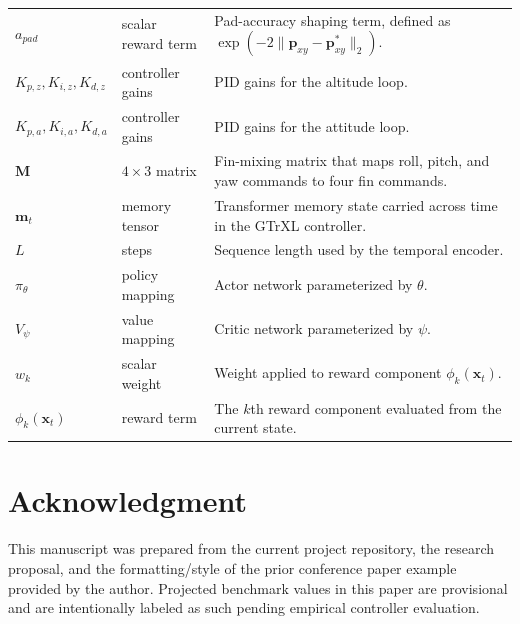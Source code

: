 \documentclass[10pt,twocolumn]{article}
\begin{document}
\begin{table}[!t]
\begin{tabularx}{\textwidth}{@{}p{1.25in}p{1.50in}X@{}}
$a_{pad}$ & scalar reward term & Pad-accuracy shaping term, defined as $\exp(-2\|\mathbf{p}_{xy}-\mathbf{p}^{*}_{xy}\|_2)$. \\
$K_{p,z},K_{i,z},K_{d,z}$ & controller gains & PID gains for the altitude loop. \\
$K_{p,a},K_{i,a},K_{d,a}$ & controller gains & PID gains for the attitude loop. \\
$\mathbf{M}$ & $4\times 3$ matrix & Fin-mixing matrix that maps roll, pitch, and yaw commands to four fin commands. \\
$\mathbf{m}_{t}$ & memory tensor & Transformer memory state carried across time in the GTrXL controller. \\
$L$ & steps & Sequence length used by the temporal encoder. \\
$\pi_{\theta}$ & policy mapping & Actor network parameterized by $\theta$. \\
$V_{\psi}$ & value mapping & Critic network parameterized by $\psi$. \\
$w_k$ & scalar weight & Weight applied to reward component $\phi_k(\mathbf{x}_t)$. \\
$\phi_k(\mathbf{x}_t)$ & reward term & The $k$th reward component evaluated from the current state. \\
\bottomrule
\end{tabularx}
\end{table}

\section{Acknowledgment}

This manuscript was prepared from the current project repository, the research proposal, and the formatting/style of the prior conference paper example provided by the author. Projected benchmark values in this paper are provisional and are intentionally labeled as such pending empirical controller evaluation.
\end{document}
